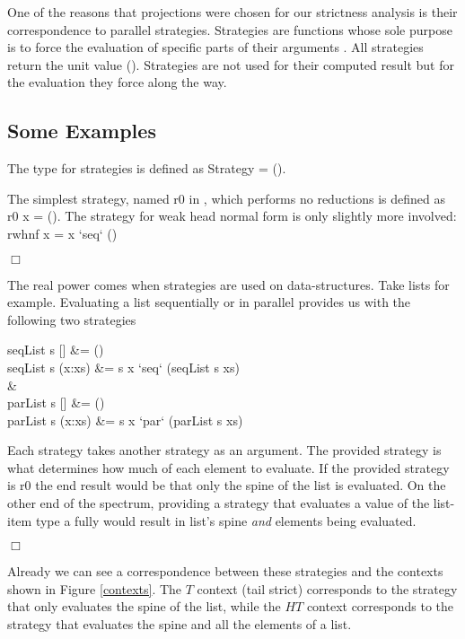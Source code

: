 One of the reasons that projections were chosen for our strictness analysis is
their correspondence to parallel strategies.  Strategies are functions whose
sole purpose is to force the evaluation of specific parts of their arguments
\citep{marlow2010seq, strategies}. All strategies return the unit value
\<()\>. Strategies are not used for their computed result but for the
evaluation they force along the way.

\subsection*{Some Examples}

The type for strategies is defined as \< Strategy \hasalpha =
\hasalpha \to ()\>.

The simplest strategy, named \<r0\> in \citep{marlow2010seq}, which performs
no reductions is defined as \<r0 x = ()\>. The strategy for weak head normal
form is only slightly more involved: \<rwhnf x = x `seq` ()\>

\hfill$\Box$

The real power comes when strategies are used on data-structures. Take
lists for example. Evaluating a list sequentially or in parallel provides us
with the following two strategies

\begin{haskell}
seqList s []     &= ()\\
seqList s (x:xs) &= s x `seq` (seqList s xs)\\
\quad&\quad\\
parList s []     &= ()\\
parList s (x:xs) &= s x `par` (parList s xs)
\end{haskell}

Each strategy takes another strategy as an argument. The provided
strategy is what determines how much of each element to evaluate. If the provided
strategy is \<r0\> the end result would be that only the spine of the list is
evaluated. On the other end of the spectrum, providing a strategy that evaluates a value
of the list-item type \<a\> fully would result in list's spine \emph{and} elements being evaluated.

\hfill$\Box$

Already we can see a correspondence between these strategies and the contexts shown
in Figure \ref{contexts}. The $T$ context (tail strict) corresponds to the strategy
that only evaluates the spine of the list, while the $HT$ context corresponds to the
strategy that evaluates the spine and all the elements of a list.

